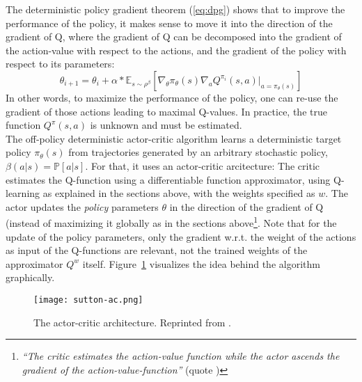 The deterministic policy gradient theorem (\ref{eq:dpg}) shows that to improve the performance of the policy, it makes sense to move it into the direction of the gradient of Q, where the gradient of Q can be decomposed into the gradient of the action-value with respect to the actions, and the gradient of the policy with respect to its parameters:
\begin{equation*}
	\theta_{i+1} = \theta_i + \alpha * \mathds{E}_{s \sim \rho^\beta} \left[ \nabla_\theta \pi_{\theta}(s) \nabla_a Q^{\pi_i}(s,a) \big|_{a=\pi_\theta(s)} \right]
\end{equation*} 
In other words, to maximize the performance of the policy, one can re-use the gradient of those actions leading to maximal Q-values. In practice, the true function $Q^\pi(s,a)$ is unknown and must be estimated.\\

\noindent The off-policy deterministic actor-critic algorithm learns a deterministic target policy $\pi_\theta(s)$ from trajectories generated by an arbitrary stochastic policy, $\beta(a|s) = \mathds{P}[a|s]$. For that, it uses an actor-critic arcitecture: The critic estimates the Q-function using a differentiable function approximator, using Q-learning as explained in the sections above, with the weights specified as $w$. The actor updates the \textit{policy} parameters $\theta$ in the direction of the gradient of Q (instead of maximizing it globally as in the sections above\footnote{\textit{``The critic estimates the action-value function while the actor ascends the gradient of the action-value-function''} (quote \cite{silver_deterministic_2014})}. Note that for the update of the policy parameters, only the gradient w.r.t. the weight of the actions as input of the Q-functions are relevant, not the trained weights of the approximator $Q^w$ itself. Figure~\ref{fig:actorcritic} visualizes the idea behind the algorithm graphically.
\begin{figure}[h]
	\texttt{[image: sutton-ac.png]}
	\centering
	\caption[The actor-critic architecture]{The actor-critic architecture. Reprinted from \cite{richard_s._sutton_reinforcement_1998}.}
	\label{fig:actorcritic}
\end{figure}

